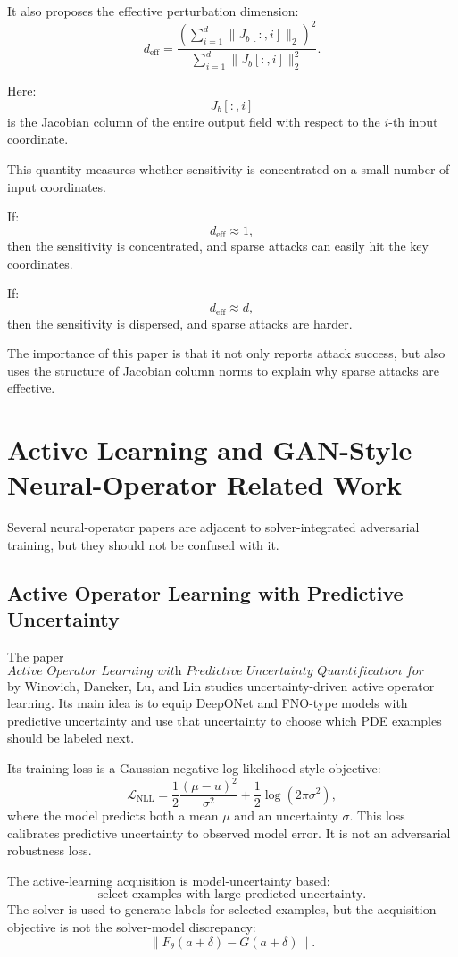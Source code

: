 \documentclass{article}
\begin{document}
It also proposes the effective perturbation dimension:
\[
d_{\mathrm{eff}}
=
\frac{
\left(
\sum_{i=1}^{d}
\|J_b[:,i]\|_2
\right)^2
}{
\sum_{i=1}^{d}
\|J_b[:,i]\|_2^2
}.
\]

Here:
\[
J_b[:,i]
\]
is the Jacobian column of the entire output field with respect to the \(i\)-th input coordinate.

This quantity measures whether sensitivity is concentrated on a small number of input coordinates.

If:
\[
d_{\mathrm{eff}}\approx 1,
\]
then the sensitivity is concentrated, and sparse attacks can easily hit the key coordinates.

If:
\[
d_{\mathrm{eff}}\approx d,
\]
then the sensitivity is dispersed, and sparse attacks are harder.

The importance of this paper is that it not only reports attack success, but also uses the structure of Jacobian column norms to explain why sparse attacks are effective.

\section{Active Learning and GAN-Style Neural-Operator Related Work}

Several neural-operator papers are adjacent to solver-integrated adversarial
training, but they should not be confused with it.

\subsection{Active Operator Learning with Predictive Uncertainty}

The paper
\[
\textit{Active Operator Learning with Predictive Uncertainty Quantification for Partial Differential Equations}
\]
by Winovich, Daneker, Lu, and Lin studies uncertainty-driven active operator
learning. Its main idea is to equip DeepONet and FNO-type models with
predictive uncertainty and use that uncertainty to choose which PDE examples
should be labeled next.

Its training loss is a Gaussian negative-log-likelihood style objective:
\[
\mathcal{L}_{\mathrm{NLL}}
=
\frac{1}{2}
\frac{(\mu-u)^2}{\sigma^2}
+
\frac{1}{2}\log(2\pi\sigma^2),
\]
where the model predicts both a mean \(\mu\) and an uncertainty \(\sigma\).
This loss calibrates predictive uncertainty to observed model error. It is not
an adversarial robustness loss.

The active-learning acquisition is model-uncertainty based:
\[
\text{select examples with large predicted uncertainty}.
\]
The solver is used to generate labels for selected examples, but the
acquisition objective is not the solver-model discrepancy:
\[
\|F_\theta(a+\delta)-G(a+\delta)\|.
\]
\end{document}

